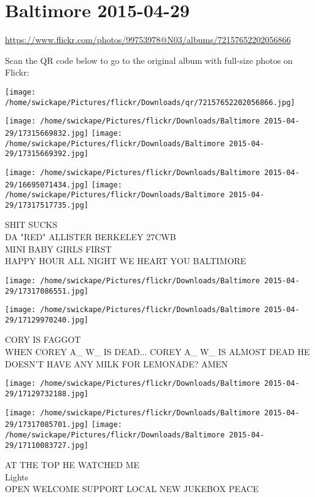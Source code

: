 \documentclass[10pt,letterpaper]{article}
\title{}
\author{}
\date{}
\begin{document}
\section*{Baltimore 2015-04-29}

\url{https://www.flickr.com/photos/99753978@N03/albums/72157652202056866}

Scan the QR code below to go to the original album with full-size photos on Flickr:

\texttt{[image: /home/swickape/Pictures/flickr/Downloads/qr/72157652202056866.jpg]}
\pagebreak

\texttt{[image: /home/swickape/Pictures/flickr/Downloads/Baltimore 2015-04-29/17315669832.jpg]}
\texttt{[image: /home/swickape/Pictures/flickr/Downloads/Baltimore 2015-04-29/17315669392.jpg]}

\texttt{[image: /home/swickape/Pictures/flickr/Downloads/Baltimore 2015-04-29/16695071434.jpg]}
\texttt{[image: /home/swickape/Pictures/flickr/Downloads/Baltimore 2015-04-29/17317517735.jpg]}

SHIT SUCKS\\
DA "RED" ALLISTER BERKELEY 27CWB\\
MINI BABY GIRLS FIRST\\
HAPPY HOUR ALL NIGHT WE HEART YOU BALTIMORE
\pagebreak

\texttt{[image: /home/swickape/Pictures/flickr/Downloads/Baltimore 2015-04-29/17317086551.jpg]}

\vspace{0.25in}
\texttt{[image: /home/swickape/Pictures/flickr/Downloads/Baltimore 2015-04-29/17129970240.jpg]}

CORY IS FAGGOT\\
WHEN COREY A\_ W\_ IS DEAD...  COREY A\_ W\_ IS ALMOST DEAD HE DOESN'T HAVE ANY MILK FOR LEMONADE?  AMEN
\pagebreak

\texttt{[image: /home/swickape/Pictures/flickr/Downloads/Baltimore 2015-04-29/17129732188.jpg]}

\vspace{0.25in}
\texttt{[image: /home/swickape/Pictures/flickr/Downloads/Baltimore 2015-04-29/17317085701.jpg]}
\texttt{[image: /home/swickape/Pictures/flickr/Downloads/Baltimore 2015-04-29/17110083727.jpg]}

AT THE TOP HE WATCHED ME\\
Lights\\
OPEN WELCOME SUPPORT LOCAL NEW JUKEBOX PEACE
\pagebreak
\end{document}
